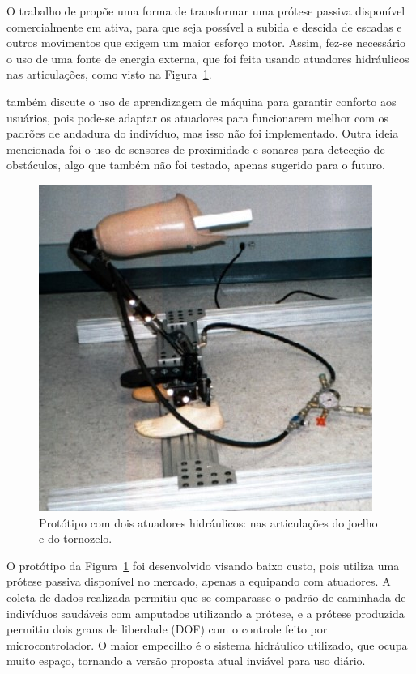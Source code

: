 O trabalho de  propõe uma forma de transformar uma prótese passiva disponível comercialmente em ativa, para que seja possível a subida e descida de escadas e outros movimentos que exigem um maior esforço motor. Assim, fez-se necessário o uso de uma fonte de energia externa, que foi feita usando atuadores hidráulicos nas articulações, como visto na Figura~\ref{fig:rel_smartleg_1}.

 também discute o uso de aprendizagem de máquina para garantir conforto aos usuários, pois pode-se adaptar os atuadores para funcionarem melhor com os padrões de andadura do indivíduo, mas isso não foi implementado. Outra ideia mencionada foi o uso de sensores de proximidade e sonares para detecção de obstáculos, algo que também não foi testado, apenas sugerido para o futuro.

\begin{figure}[ht]
	\caption{\label{fig:rel_smartleg_1}Protótipo com dois atuadores hidráulicos: nas articulações do joelho e do tornozelo.}
	\begin{center}
	    \includegraphics[width=.35\textwidth]{resources/rel_dedic_smart_leg_1}
	\end{center}
\end{figure}

O protótipo da Figura~\ref{fig:rel_smartleg_1} foi desenvolvido visando baixo custo, pois utiliza uma prótese passiva disponível no mercado, apenas a equipando com atuadores. A coleta de dados realizada permitiu que se comparasse o padrão de caminhada de indivíduos saudáveis com amputados utilizando a prótese, e a prótese produzida permitiu dois graus de liberdade (DOF) com o controle feito por microcontrolador. O maior empecilho é o sistema hidráulico utilizado, que ocupa muito espaço, tornando a versão proposta atual inviável para uso diário.


